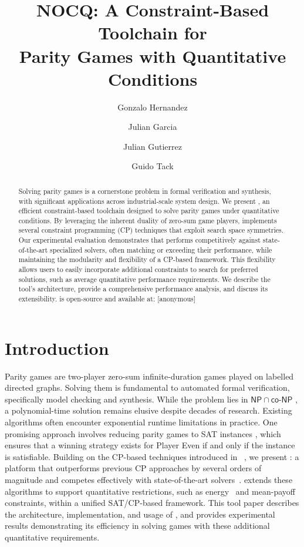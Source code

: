 \documentclass[a4paper,UKenglish,cleveref, autoref, thm-restate, anonymous]{lipics-v2021}
\title{NOCQ: A Constraint-Based Toolchain for\\Parity Games with Quantitative Conditions} %
\author{Gonzalo Hernandez}{Monash University \and Universidad de Nariño}{gonzalo.hernandez@monash.edu\footnote{Also reachable at \texttt{gonzalo.hernandez@udenar.edu.co}}}{}{}
\author{Julian Garcia}{Monash University}{julian.garcia@monash.edu}{}{}
\author{Julian Gutierrez}{University of Sussex}{J.Gutierrez@sussex.ac.uk}{}{}
\author{Guido Tack}{Monash University \and OPTIMA ARC ITTC}{guido.tack@monash.edu}{}{}
\begin{document}
\maketitle

\begin{abstract}
Solving parity games is a cornerstone problem in formal verification and synthesis, with significant applications across industrial-scale system design. We present \nocq, an efficient constraint-based toolchain designed to solve parity games under quantitative conditions. By leveraging the inherent duality of zero-sum game players, \nocq implements several constraint programming (CP) techniques that exploit search space symmetries. Our experimental evaluation demonstrates that \nocq performs competitively against state-of-the-art specialized solvers, often matching or exceeding their performance, while maintaining the modularity and flexibility of a CP-based framework. This flexibility allows users to easily incorporate additional constraints to search for preferred solutions, such as average quantitative performance requirements. We describe the tool's architecture, provide a comprehensive performance analysis, and discuss its extensibility. \nocq is open-source and available at: [anonymous]

\end{abstract}

\section{Introduction}

Parity games are two-player zero-sum infinite-duration games played on labelled directed graphs. Solving them is fundamental to automated formal verification, specifically model checking and synthesis. While the problem lies in $\mathsf{NP} \cap \mathsf{co\textit{-}NP}$ , a polynomial-time solution remains elusive despite decades of research. Existing algorithms often encounter exponential runtime limitations in practice. One promising approach involves reducing parity games to SAT instances , which ensures that a winning strategy exists for Player Even if and only if the instance is satisfiable.  Building on the CP-based techniques introduced in~\cite{Hernandez:2026:noc} , we present \nocq: a platform that outperforms previous CP approaches by several orders of magnitude and competes effectively with state-of-the-art solvers~\cite{vanDijk:2018,Benerecetti:2025,Aggarwal:2023}. \nocq extends these algorithms to support quantitative restrictions, such as energy~\cite{ChatterjeeD12} and mean-payoff~\cite{ChatterjeeHS17} constraints, within a unified SAT/CP-based framework. This tool paper describes the architecture, implementation, and usage of \nocq, and provides experimental results demonstrating its efficiency in solving games with these additional quantitative requirements. 
\end{document}
